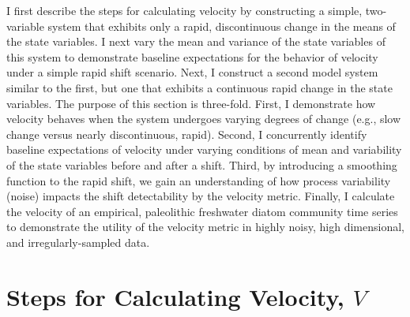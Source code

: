 \documentclass[12pt,twoside,openany]{reedthesis}
\begin{document}
I first describe the steps for calculating velocity by constructing a simple, two-variable system that exhibits only a rapid, discontinuous change in the means of the state variables. I next vary the mean and variance of the state variables of this system to demonstrate baseline expectations for the behavior of velocity under a simple rapid shift scenario. Next, I construct a second model system similar to the first, but one that exhibits a continuous rapid change in the state variables. The purpose of this section is three-fold. First, I demonstrate how velocity behaves when the system undergoes varying degrees of change (e.g., slow change versus nearly discontinuous, rapid). Second, I concurrently identify baseline expectations of velocity under varying conditions of mean and variability of the state variables before and after a shift. Third, by introducing a smoothing function to the rapid shift, we gain an understanding of how process variability (noise) impacts the shift detectability by the velocity metric. Finally, I calculate the velocity of an empirical, paleolithic freshwater diatom community time series to demonstrate the utility of the velocity metric in highly noisy, high dimensional, and irregularly-sampled data.

\hypertarget{steps-for-calculating-velocity-v}{%
\section{\texorpdfstring{Steps for Calculating Velocity, \(V\)}{Steps for Calculating Velocity, V}}\label{steps-for-calculating-velocity-v}}
\end{document}
